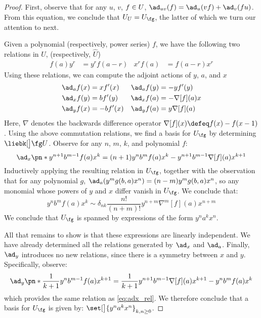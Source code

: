 \documentclass{article}
\begin{document}
\begin{proof}
First, observe that for any $u$, $v$, $f\in U$,
$\ad_{uv}(f) = \ad_u(vf) + \ad_v(fu)$. From this equation, we conclude that
$\CU_\CU = \CU_\Alg$, the latter of which we turn our attention to next.

Given a polynomial (respectively, power series) $f$, we have the following two
relations in $U$, (respectively, $\widehat U$)
\begin{align}
        f(a)y^r &= y^rf(a-r) &
        x^rf(a) &= f(a-r)x^r
\end{align}
Using these relations, we can compute the adjoint actions of $y$, $a$, and $x$
\begin{align}
  \ad_a f(x) &= xf'(x)&
  \ad_a f(y) &= -yf'(y)\label{eq:ada}\\
  \ad_x f(y) &= bf'(y) &
  \ad_x f(a) &= -\nabla[f](a)x\label{eq:adx}\\
  \ad_y f(x) &= -bf'(x) &
  \ad_y f(a) &= y\nabla[f](a)\label{eq:ady}
\end{align}
Here, $\nabla$ denotes the backwards difference operator $\nabla[f](x) \defeq
f(x) - f(x-1)$. Using the above commutation relations, we find a basis for
$U_{\fg}$ by determining $\liebk[\big] \fg U$. Observe for any $n$, $m$, $k$,
and polynomial $f$:
\begin{equation}\label{eq:adx_rel}
\ad_{x}\pn*{y^{n+1}b^{m-1}f(a)x^{k}} =
(n+1)y^{n}b^{m}f(a)x^{k} - y^{n+1}b^{m-1}\nabla[f](a)x^{k+1}
\end{equation}
Inductively applying the resulting relation in $U_{\fg}$, together with the
observation that for any polynomial $g$,
$\ad_a (y^m g(b, a) x^n ) = (n-m)y^mg(b, a) x^n$,
so any monomial whose powers of $y$ and $x$ differ vanish in $\CU_{\Alg}$. We
conclude that:
\begin{equation}
        y^n b^m f(a) x^k \sim δ_{nk}\frac{n!}{(n+m)!}y^{n+m}\nabla^m[f](a)x^{n+m}
\end{equation}
We conclude that $\CU_{\Alg}$ is spanned by expressions of the form
$y^n a^k x^n$.

All that remains to show is that these expressions are linearly independent. We
have already determined all the relations generated by $\ad_x$ and $\ad_a$.
Finally, $\ad_y$ introduces no new relations, since there is a symmetry between
$x$ and $y$. Specifically, observe:
\begin{equation}
        \ad_y\pn*{
                \frac1{k+1}y^n b^{m-1} f(a) x^{k+1}
        }
        =\frac1{k+1} y^{n+1} b^{m-1} \nabla[f](a)x^{k+1} - y^n b^m f(a) x^k
\end{equation}
which provides the same relation as \cref{eq:adx_rel}. We therefore conclude
that a basis for $\CU_{\Alg}$ is given by:
$\set[\big]{y^n a^k x^n}_{k, n \ge 0}$.
\end{proof}
\end{document}
